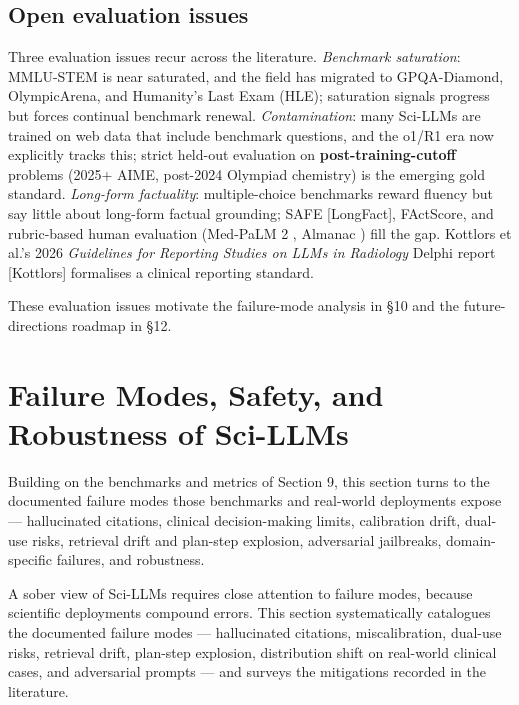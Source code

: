 \documentclass{article}
\begin{document}
\subsection{Open evaluation issues}\label{open-evaluation-issues}

Three evaluation issues recur across the literature. \emph{Benchmark saturation}: MMLU-STEM is near saturated, and the field has migrated to GPQA-Diamond, OlympicArena, and Humanity's Last Exam (HLE); saturation signals progress but forces continual benchmark renewal. \emph{Contamination}: many Sci-LLMs are trained on web data that include benchmark questions, and the o1/R1 era now explicitly tracks this; strict held-out evaluation on \textbf{post-training-cutoff} problems (2025+ AIME, post-2024 Olympiad chemistry) is the emerging gold standard. \emph{Long-form factuality}: multiple-choice benchmarks reward fluency but say little about long-form factual grounding; SAFE {[}LongFact{]}, FActScore, and rubric-based human evaluation (Med-PaLM 2 \cite{singhal2025towardexpertlevelm}, Almanac \cite{zakka2024almanacretrievalau}) fill the gap. Kottlors et al.'s 2026 \emph{Guidelines for Reporting Studies on LLMs in Radiology} Delphi report {[}Kottlors{]} formalises a clinical reporting standard.

These evaluation issues motivate the failure-mode analysis in §10 and the future-directions roadmap in §12.

\section{Failure Modes, Safety, and Robustness of Sci-LLMs}\label{failure-modes-safety-and-robustness-of-sci-llms}

Building on the benchmarks and metrics of Section 9, this section turns to the documented failure modes those benchmarks and real-world deployments expose --- hallucinated citations, clinical decision-making limits, calibration drift, dual-use risks, retrieval drift and plan-step explosion, adversarial jailbreaks, domain-specific failures, and robustness.

A sober view of Sci-LLMs requires close attention to failure modes, because scientific deployments compound errors. This section systematically catalogues the documented failure modes --- hallucinated citations, miscalibration, dual-use risks, retrieval drift, plan-step explosion, distribution shift on real-world clinical cases, and adversarial prompts --- and surveys the mitigations recorded in the literature.
\end{document}
